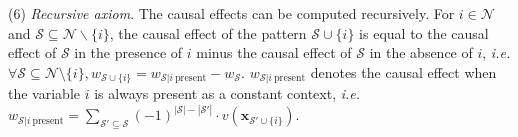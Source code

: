 (6) \textit{Recursive axiom}. The causal effects can be computed recursively.
For {\small $i\in \mathcal{N}$} and {\small $\mathcal{S}\subseteq \mathcal{N}\backslash\{i\}$}, the causal effect of the pattern {\small $\mathcal{S}\cup\{i\}$} is equal to the causal effect of {\small $\mathcal{S}$} in the presence of $i$ minus the causal effect of $\mathcal{S}$ in the absence of $i$, \emph{i.e.} {\small $\forall \mathcal{S}\!\subseteq\! \mathcal{N}\!\setminus\!\{i\}, w_{\mathcal{S}\cup\{i\}} = w_{\mathcal{S}|i~\text{present}} - w_{\mathcal{S}}$}. {\small $w_{\mathcal{S}|i~\text{present}}$} denotes the causal effect when the variable $i$ is always present as a constant context, \emph{i.e.} {\small $
w_{\mathcal{S}|i~\text{present}}=\sum_{\mathcal{S}'\subseteq \mathcal{S}} (-1)^{|\mathcal{S}|-|\mathcal{S}'|}\cdot v(\boldsymbol{x}_{\mathcal{S}'\cup\{i\}})$}.
